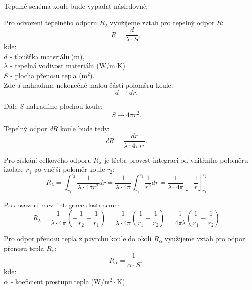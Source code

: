 \documentclass{article}
\begin{document}
Tepelné schéma koule bude vypadat následovně:

\begin{center}
\end{center}


Pro odvození tepelného odporu $R_{\lambda}$ využijeme vztah pro tepelný odpor $R$:
$$
    R = \frac{d}{\lambda \cdot S},
$$
kde:\\
$d$ - tloušťka materiálu (m),\\
$\lambda$ - tepelná vodivost materiálu (W/m$\cdot$K),\\
$S$ - plocha přenosu tepla (m$^2$).\\

Zde $d$ nahradíme nekonečně malou částí poloměru koule:
$$
    d \rightarrow dr.
$$

Dále $S$ nahradíme plochou koule:
$$
    S \rightarrow 4 \pi r^2.
$$

Tepelný odpor $dR$ koule bude tedy:
$$
    dR = \frac{dr}{\lambda \cdot 4 \pi r^2}.
$$

Pro získání celkového odporu $R_{\lambda}$ je třeba provést integraci od vnitřního poloměru izolace $r_1$ po vnější poloměr koule $r_2$:
$$
    R_{\lambda} = \int_{r_1}^{r_2} \frac{1}{\lambda \cdot 4 \pi r^2} dr = \frac{1}{\lambda \cdot 4 \pi} \int_{r_1}^{r_2} \frac{1}{r^2} dr = \frac{1}{\lambda \cdot 4 \pi} \left[ -\frac{1}{r} \right]_{r_1}^{r_2}
$$

Po dosazení mezí integrace dostaneme:
$$
    R_{\lambda} = \frac{1}{\lambda \cdot 4 \pi} \left( -\frac{1}{r_2} + \frac{1}{r_1} \right) = \frac{1}{\lambda \cdot 4 \pi} \left( \frac{1}{r_1} - \frac{1}{r_2} \right) = \frac{1}{4 \pi \lambda} \left( \frac{1}{r_1} - \frac{1}{r_2} \right)
$$

Pro odpor přenosu tepla z povrchu koule do okolí $R_{\alpha}$ využijeme vztah pro odpor přenosu tepla $R_{\alpha}$:
$$
    R_{\alpha} = \frac{1}{\alpha \cdot S},
$$
kde:\\
$\alpha$ - koeficient prostupu tepla (W/m$^2 \cdot$K).\\
\end{document}
